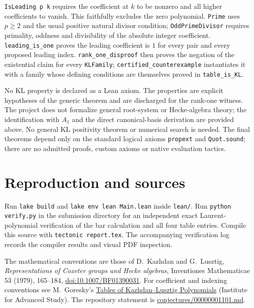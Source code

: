 \documentclass[11pt]{article}
\begin{document}
\texttt{IsLeading p k} requires the coefficient at $k$ to be nonzero
and all higher coefficients to vanish. This faithfully excludes the
zero polynomial. \texttt{Prime} uses $p\geq2$ and the usual positive
natural divisor condition; \texttt{OddPrimeDivisor} requires primality,
oddness and divisibility of the absolute integer coefficient.
\texttt{leading\_is\_one} proves the leading coefficient is $1$ for
every pair and every proposed leading index.
\texttt{rank\_one\_disproof} then proves the negation of the existential
claim for every \texttt{KLFamily}; \texttt{certified\_counterexample}
instantiates it with a family whose defining conditions are themselves
proved in \texttt{table\_is\_KL}.

No KL property is declared as a Lean axiom. The properties are explicit
hypotheses of the generic theorem and are discharged for the rank-one
witness. The project does not formalize general root-system or Hecke-algebra
theory; the identification with $A_1$ and the direct canonical-basis
derivation are provided above. No general KL positivity theorem or
numerical search is needed. The final theorems depend only on the standard
logical axioms \texttt{propext} and \texttt{Quot.sound}; there are no
admitted proofs, custom axioms or native evaluation tactics.

\section{Reproduction and sources}
Run \texttt{lake build} and \texttt{lake env lean Main.lean} inside
\texttt{lean/}. Run \texttt{python verify.py} in the submission directory
for an independent exact Laurent-polynomial verification of the bar
calculation and all four table entries. Compile this source with
\texttt{tectonic report.tex}. The accompanying verification log records
the compiler results and visual PDF inspection.

The mathematical conventions are those of D.~Kazhdan and G.~Lusztig,
\emph{Representations of Coxeter groups and Hecke algebras},
Inventiones Mathematicae 53 (1979), 165--184,
\href{https://doi.org/10.1007/BF01390031}{doi:10.1007/BF01390031}.
For coefficient and indexing conventions see M.~Goresky's
\href{https://www.math.ias.edu/~goresky/tables.html}{Tables of
Kazhdan--Lusztig Polynomials} (Institute for Advanced Study).
The repository statement is
\href{https://github.com/The-Last-Math-Competition/The-Last-Math-Competition/blob/main/conjectures/00000001101.md}{conjectures/00000001101.md}.
\end{document}
